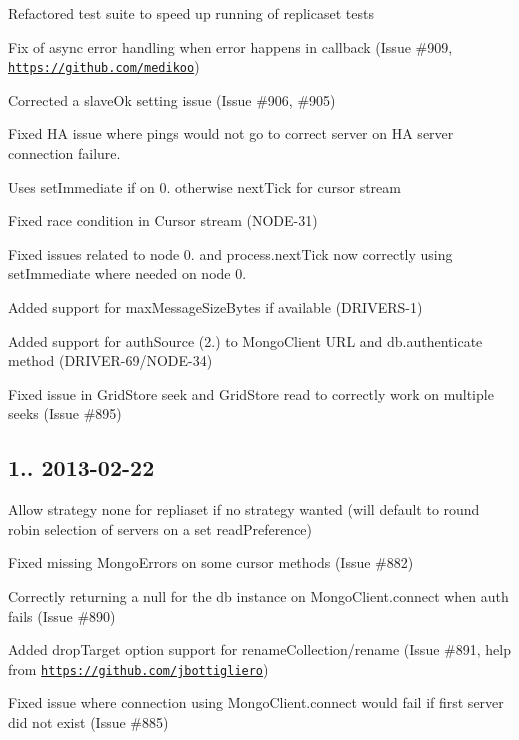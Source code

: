 \begin{DoxyItemize}
\item Refactored test suite to speed up running of replicaset tests
\item Fix of async error handling when error happens in callback (Issue \#909, \href{https://github.com/medikoo}{\tt https\+://github.\+com/medikoo})
\item Corrected a slave\+Ok setting issue (Issue \#906, \#905)
\item Fixed HA issue where ping\textquotesingle{}s would not go to correct server on HA server connection failure.
\item Uses set\+Immediate if on 0. otherwise next\+Tick for cursor stream
\item Fixed race condition in Cursor stream (N\+O\+D\+E-\/31)
\item Fixed issues related to node 0. and process.\+next\+Tick now correctly using set\+Immediate where needed on node 0.
\item Added support for max\+Message\+Size\+Bytes if available (D\+R\+I\+V\+E\+R\+S-\/1)
\item Added support for auth\+Source (2.) to Mongo\+Client U\+RL and db.\+authenticate method (D\+R\+I\+V\+E\+R-\/69/\+N\+O\+D\+E-\/34)
\item Fixed issue in Grid\+Store seek and Grid\+Store read to correctly work on multiple seeks (Issue \#895)
\end{DoxyItemize}

\subsection*{1.. 2013-\/02-\/22 }


\begin{DoxyItemize}
\item Allow strategy \textquotesingle{}none\textquotesingle{} for repliaset if no strategy wanted (will default to round robin selection of servers on a set read\+Preference)
\item Fixed missing Mongo\+Errors on some cursor methods (Issue \#882)
\item Correctly returning a null for the db instance on Mongo\+Client.\+connect when auth fails (Issue \#890)
\item Added drop\+Target option support for rename\+Collection/rename (Issue \#891, help from \href{https://github.com/jbottigliero}{\tt https\+://github.\+com/jbottigliero})
\item Fixed issue where connection using Mongo\+Client.\+connect would fail if first server did not exist (Issue \#885)
\end{DoxyItemize}

